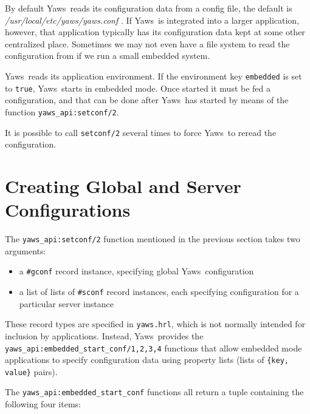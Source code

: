 \documentclass[11pt,oneside,english]{book}
\newcommand{\Yaws}            %
        {{\sc Yaws}}
\begin{document}
By default \Yaws\ reads its configuration data from a config file, the
default is \textit{/usr/local/etc/yaws/yaws.conf} . If \Yaws\ is integrated
into a larger application, however, that application typically has its
configuration data kept at some other centralized place. Sometimes we
may not even have a file system to read the configuration from if we
run a small embedded system.

\Yaws\  reads its application environment. If the environment key
\verb+embedded+ is set to \verb+true+, \Yaws\  starts in embedded mode.
Once started it must be fed a configuration, and that can be done
after \Yaws\  has started by means of the function
\verb+yaws_api:setconf/2+.

It is possible to call \verb+setconf/2+ several times to force \Yaws\  to
reread the configuration.

\section{Creating Global and Server Configurations}

The \verb+yaws_api:setconf/2+ function mentioned in the previous
section takes two arguments:

\begin{itemize}

\item a \verb+#gconf+ record instance, specifying global
  \Yaws\ configuration

\item a list of lists of \verb+#sconf+ record instances, each
  specifying configuration for a particular server instance

\end{itemize}

These record types are specified in \verb+yaws.hrl+, which is not
normally intended for inclusion by applications. Instead,
\Yaws\  provides the \verb+yaws_api:embedded_start_conf/1,2,3,4+
functions that allow embedded mode applications to specify
configuration data using property lists (lists of
\verb+{key, value}+ pairs).

The \verb+yaws_api:embedded_start_conf+ functions all return a tuple
containing the following four items:
\end{document}
